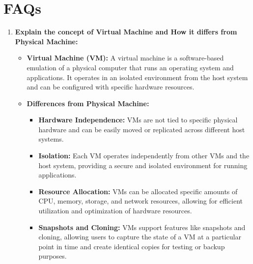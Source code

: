 \documentclass[11pt]{article}
\begin{document}
% 

\section{FAQs}

\begin{enumerate}
    \item \textbf{Explain the concept of Virtual Machine and How it differs from Physical Machine:}
          \begin{itemize}
              \item \textbf{Virtual Machine (VM):} A virtual machine is a software-based emulation of a physical computer that runs an operating system and applications. It operates in an isolated environment from the host system and can be configured with specific hardware resources.
              \item \textbf{Differences from Physical Machine:}
                    \begin{itemize}
                        \item \textbf{Hardware Independence:} VMs are not tied to specific physical hardware and can be easily moved or replicated across different host systems.
                        \item \textbf{Isolation:} Each VM operates independently from other VMs and the host system, providing a secure and isolated environment for running applications.
                        \item \textbf{Resource Allocation:} VMs can be allocated specific amounts of CPU, memory, storage, and network resources, allowing for efficient utilization and optimization of hardware resources.
                        \item \textbf{Snapshots and Cloning:} VMs support features like snapshots and cloning, allowing users to capture the state of a VM at a particular point in time and create identical copies for testing or backup purposes.
                    \end{itemize}
          \end{itemize}


\end{enumerate}
\end{document}
